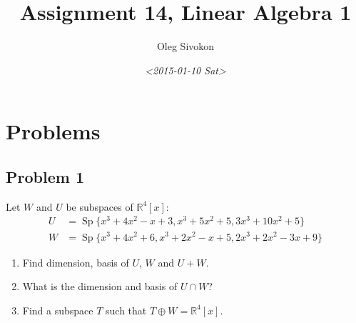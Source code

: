 \documentclass[fleqn]{article}
\author{Oleg Sivokon}
\date{\textit{<2015-01-10 Sat>}}
\title{Assignment 14, Linear Algebra 1}
\DeclareMathOperator{\Sp}{Sp}
\begin{document}
\maketitle
\tableofcontents



 \clearpage

\section{Problems}
\label{sec-1}

\subsection{Problem 1}
\label{sec-1-1}

Let $W$ and $U$ be subspaces of $\mathbb{R}^4[x]$:
\begin{align*}
  U &= \Sp \{ x^3 + 4x^2 - x + 3, x^3 + 5x^2 + 5, 3x^3 + 10x^2 + 5 \} \\
  W &= \Sp \{ x^3 + 4x^2 + 6, x^3 + 2x^2 - x + 5, 2x^3 + 2x^2 - 3x + 9 \}
\end{align*}


\begin{enumerate}
\item Find dimension, basis of $U$, $W$ and $U+W$.
\item What is the dimension and basis of $U \cap W$?
\item Find a subspace $T$ such that $T \oplus W = \mathbb{R}^4[x]$.
\end{enumerate}
\end{document}
